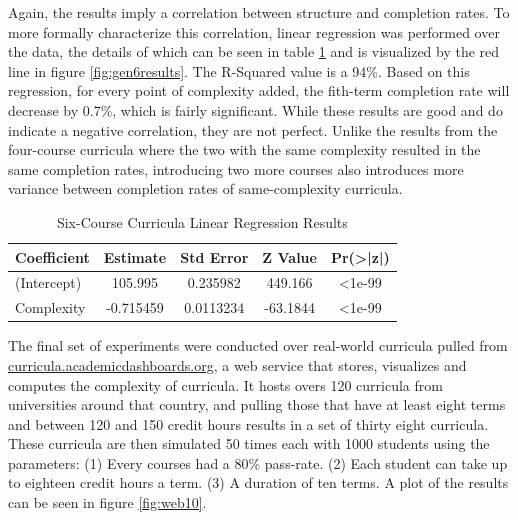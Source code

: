 \documentclass[botnum, fleqn]{unmeethesis}
\begin{document}
    Again, the results imply a correlation between structure and completion rates. To more formally characterize this correlation, linear regression was performed over the data, the details of which can be seen in table \ref{tab:gen6reg} and is visualized by the red line in figure \ref{fig:gen6results}. The R-Squared value is a 94\%. Based on this regression, for every point of complexity added, the fith-term completion rate will decrease by 0.7\%, which is fairly significant. While these results are good and do indicate a negative correlation, they are not perfect. Unlike the results from the four-course curricula where the two with the same complexity resulted in the same completion rates, introducing two more courses also introduces more variance between completion rates of same-complexity curricula.

    \begin{table}[!h]
      \centering
      \caption{Six-Course Curricula Linear Regression Results}
      \label{tab:gen6reg}
      \begin{tabular}{l*{4}{c}}
        Coefficient & Estimate  & Std Error & Z Value & Pr(>|z|) \\
        \hline
        (Intercept) & 105.995   & 0.235982  & 449.166 & <1e-99 \\
        Complexity  & -0.715459 & 0.0113234 & -63.1844 &  <1e-99  \\
      \end{tabular}
    \end{table}

    The final set of experiments were conducted over real-world curricula pulled from \href{http://curricula.academicdashboards.org}{curricula.academicdashboards.org}, a web service that stores, visualizes and computes the complexity of curricula. It hosts overs 120 curricula from universities around that country, and pulling those that have at least eight terms and between 120 and 150 credit hours results in a set of thirty eight curricula. These curricula are then simulated 50 times each with 1000 students using the parameters: (1) Every courses had a 80\% pass-rate. (2) Each student can take up to eighteen credit hours a term. (3) A duration of ten terms. A plot of the results can be seen in figure \ref{fig:web10}.
\end{document}

